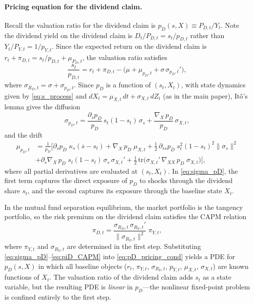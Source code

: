 \documentclass[11pt,english]{article}
\begin{document}
\paragraph{Pricing equation for the dividend claim.}
Recall the valuation ratio for the dividend claim is $p_D(s,X)\equiv P_{D,t}/Y_t$.
Note the dividend yield on the dividend claim is $D_t/P_{D,t}=s_t/p_{D,t}$
rather than $Y_t/P_{Y,t} = 1/p_{Y,t}$. Since the expected return on the dividend claim is $r_t+\pi_{D,t} = s_t/p_{D,t} + \mu_{P_D,t}$, the valuation ratio satisfies
\begin{equation}\label{eq:pD_pricing_cond}
    \frac{s_t}{p_{D,t}} = r_t + \pi_{D,t} - \big(\mu + \mu_{p_D,t} + \sigma\,\sigma_{p_D,t}'\big),
\end{equation}
where $\sigma_{R_D,t} = \sigma + \sigma_{p_D,t}$. Since $p_D$ is a function of $(s_t,X_t)$, with state dynamics given by \eqref{eq:s_process} and $dX_t = \mu_{X,t}\,dt + \sigma_{X,t}\,dZ_t$ (as in the main paper), It\^{o}'s lemma gives the diffusion
\begin{equation}\label{eq:sigma_pD}
    \sigma_{p_D,t}
    = \frac{\partial_s p_D}{p_D}\,s_t(1-s_t)\,\sigma_s
    + \frac{\nabla_{\!X}\, p_D}{p_D}\,\sigma_{X,t},
\end{equation}
and the drift
\begin{align}\label{eq:mu_pD}
    \mu_{p_D,t}
    &= \frac{1}{p_D}\bigg[
    \partial_s p_D\;\kappa_s(\overline{s}-s_t)
    + \nabla_{\!X}\, p_D\;\mu_{X,t}
    + \tfrac{1}{2}\,\partial_{ss} p_D\;s_t^2(1-s_t)^2\|\sigma_s\|^2\nonumber\\
    &+ \partial_s \nabla_{\!X}\, p_D\;s_t(1-s_t)\,\sigma_s\,\sigma_{X,t}'
    + \tfrac{1}{2}\,\mathrm{tr}\big(\sigma_{X,t}'\,\nabla_{\!XX}\, p_D\;\sigma_{X,t}\big)
    \bigg],
\end{align}
where all partial derivatives are evaluated at $(s_t,X_t)$. In \eqref{eq:sigma_pD}, the first term captures the direct exposure of $p_D$ to shocks through the dividend share $s_t$, and the second captures its exposure through the baseline state $X_t$.

In the mutual fund separation equilibrium, the market portfolio is the tangency portfolio, so the risk premium on the dividend claim satisfies the CAPM relation
\begin{equation}\label{eq:piD_CAPM}
    \pi_{D,t} = \frac{\sigma_{R_D,t}\,\sigma_{R_Y,t}'}{\|\sigma_{R_Y,t}\|^2}\;\pi_{Y,t},
\end{equation}
where $\pi_{Y,t}$ and $\sigma_{R_Y,t}$ are determined in the first step. Substituting \eqref{eq:sigma_pD}--\eqref{eq:piD_CAPM} into \eqref{eq:pD_pricing_cond} yields a PDE for $p_D(s,X)$ in which all baseline objects ($r_t$, $\pi_{Y,t}$, $\sigma_{R_Y,t}$, $p_{Y,t}$, $\mu_{X,t}$, $\sigma_{X,t}$) are known functions of $X_t$. The valuation ratio of the dividend claim adds $s_t$ as a state variable, but the resulting PDE is \emph{linear} in $p_D$---the nonlinear fixed-point problem is confined entirely to the first step.
\end{document}
